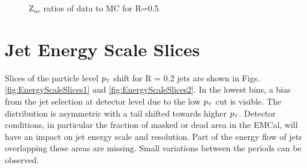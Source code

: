 \documentclass[ALICE]{ALICE_analysis_notes}
\newcommand{\pT}{$p_{\mbox{\tiny T}}$\xspace}
\begin{document}
\begin{appendix}
\begin{figure}[h!]
    \qquad
    \caption{Z$_{ne}$ ratios of data to MC for R=0.5.}
    \label{fig:TriggerBiasRatiosZneR05pPb}
\end{figure}

\newpage

\section{Jet Energy Scale Slices}
\label{sec:AppendixJES}

Slices of the particle level \pT shift for R = 0.2 jets are shown in Figs. \ref{fig:EnergyScaleSlices1} and \ref{fig:EnergyScaleSlices2}. In the lowest bins, a bias from the jet selection at detector level due to the low \pT cut is visible. The distribution is asymmetric with a tail shifted towards higher \pT. Detector conditions, in particular the fraction of masked or dead area in the EMCal, will have an impact on jet energy scale and resolution. Part of the energy flow of jets overlapping these areas are missing. Small variations between the periods can be observed.

\newpage


\end{appendix}
\end{document}
